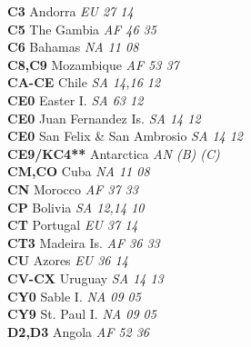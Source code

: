 ﻿\documentclass[landscape,a4paper]{article}
\begin{document}
\begin{multicols}{6}
\textbf{C3                      } Andorra                            \emph{ EU     27     14    } \\
\textbf{C5                      } The Gambia                         \emph{ AF     46     35    } \\
\textbf{C6                      } Bahamas                            \emph{ NA     11     08    } \\
\textbf{C8,C9                   } Mozambique                         \emph{ AF     53     37    } \\
\textbf{CA-CE                   } Chile                              \emph{ SA     14,16  12    } \\
\textbf{CE0                     } Easter I.                          \emph{ SA     63     12    } \\
\textbf{CE0                     } Juan Fernandez Is.                 \emph{ SA     14     12    } \\
\textbf{CE0                     } San Felix \& San Ambrosio          \emph{ SA     14     12    } \\
\textbf{CE9/KC4**               } Antarctica                         \emph{ AN     (B)    (C)   } \\
\textbf{CM,CO                   } Cuba                               \emph{ NA     11     08    } \\
\textbf{CN                      } Morocco                            \emph{ AF     37     33    } \\
\textbf{CP                      } Bolivia                            \emph{ SA     12,14  10    } \\
\textbf{CT                      } Portugal                           \emph{ EU     37     14    } \\
\textbf{CT3                     } Madeira Is.                        \emph{ AF     36     33    } \\
\textbf{CU                      } Azores                             \emph{ EU     36     14    } \\
\textbf{CV-CX                   } Uruguay                            \emph{ SA     14     13    } \\
\textbf{CY0                     } Sable I.                           \emph{ NA     09     05    } \\
\textbf{CY9                     } St. Paul I.                        \emph{ NA     09     05    } \\
\textbf{D2,D3                   } Angola                             \emph{ AF     52     36    } \\

\end{multicols}
\end{document}

